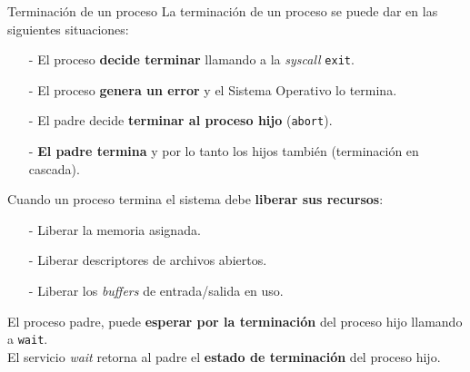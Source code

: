 \documentclass[aspectratio=169]{beamer}
\begin{document}
\begin{frame}[t]{Terminación de un proceso}
    La terminación de un proceso se puede dar en las siguientes situaciones:
    \begin{itemize}
    \item[-] El proceso \textcolor{naranjauca}{\textbf{decide terminar}} llamando a la \emph{syscall} \texttt{exit}.
    \item[-] El proceso \textcolor{naranjauca}{\textbf{genera un error}} y el Sistema Operativo lo termina.
    \item[-] El padre decide \textcolor{naranjauca}{\textbf{terminar al proceso hijo}} (\texttt{abort}).
    \item[-] \textcolor{naranjauca}{\textbf{El padre termina}} y por lo tanto los hijos también (terminación en cascada).
    \end{itemize}
    \medskip
    \pause
    \begin{tcolorbox}[size=small,width=0.7\textwidth,sharp corners,title={}]
    \small
    \color{verdeuca}
    Cuando un proceso termina el sistema debe \textbf{liberar sus recursos}:
    \begin{itemize} \color{verdeuca}
    \setlength\itemsep{0cm}
        \item[\textcolor{verdeuca}{-}] Liberar la memoria asignada.
        \item[\textcolor{verdeuca}{-}] Liberar descriptores de archivos abiertos.
        \item[\textcolor{verdeuca}{-}] Liberar los \emph{buffers} de entrada/salida en uso.
    \end{itemize}
    \end{tcolorbox}
    \medskip
    \pause
    El proceso padre, puede \textcolor{verdeuca}{\textbf{esperar por la terminación}} del proceso hijo llamando a \texttt{wait}.\\
    \medskip
    El servicio \emph{wait} retorna al padre el \textcolor{verdeuca}{\textbf{estado de terminación}} del proceso hijo.
\end{frame}
\end{document}
